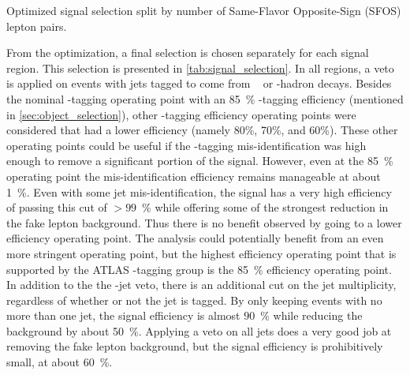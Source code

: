 \begin{table}[ht!]
\centering
\begin{tiny}

\end{tiny}
\caption{Optimized signal selection split by number of Same-Flavor Opposite-Sign (SFOS) lepton pairs.}
\label{tab:signal_selection}
\end{table}








From the optimization, a final selection is chosen separately for each signal
region.  This selection is presented in \tab\ref{tab:signal_selection}.
In all regions, a veto is applied on events with jets tagged to come from \bee~
or \bee-hadron decays. Besides the nominal \bee-tagging operating
point with an 85~\% \bee-tagging efficiency (mentioned in
\sec\ref{sec:object_selection}), other 
\bee-tagging efficiency operating points
were considered that had a lower efficiency (namely 80\%, 70\%, and 60\%). 
These other operating points could be useful if the \bee-tagging mis-identification
was high enough to remove a significant portion of the signal. However,
even at the 85~\% operating point
the mis-identification efficiency remains manageable at about 1~\%. 
Even with some jet mis-identification, the signal has
a very high efficiency of passing this 
cut of $> 99$~\% while offering some of the strongest 
reduction in the fake lepton background. 
Thus there is no benefit observed by going to a lower efficiency operating point.
The analysis could potentially benefit from an even more stringent 
operating point, but the highest
efficiency operating point that is supported by the ATLAS
\bee-tagging group is the 85~\% efficiency operating point.
In addition to the the \bee-jet veto, there is an additional
cut on the jet multiplicity, regardless of whether or not 
the jet is tagged. By only keeping
events with no more than one jet, 
the signal efficiency is almost $90$~\% while reducing
the background by about 50~\%.  Applying a veto on 
all jets does a very good job at removing the fake lepton
background, but the signal efficiency is prohibitively small, at about 60~\%. 


